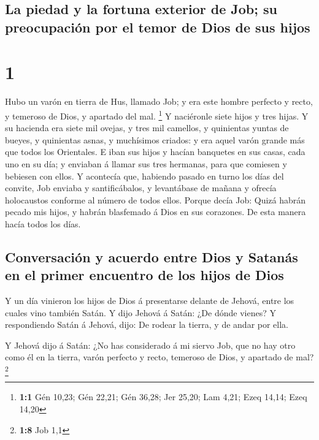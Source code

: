 \hypertarget{la-piedad-y-la-fortuna-exterior-de-job-su-preocupaciuxf3n-por-el-temor-de-dios-de-sus-hijos}{%
\subsection{La piedad y la fortuna exterior de Job; su preocupación por
el temor de Dios de sus
hijos}\label{la-piedad-y-la-fortuna-exterior-de-job-su-preocupaciuxf3n-por-el-temor-de-dios-de-sus-hijos}}

\hypertarget{section}{%
\section{1}\label{section}}

 Hubo un varón en tierra de Hus, llamado Job; y era este
hombre perfecto y recto, y temeroso de Dios, y apartado del mal.
\footnote{\textbf{1:1} Gén 10,23; Gén 22,21; Gén 36,28; Jer 25,20; Lam
  4,21; Ezeq 14,14; Ezeq 14,20}  Y naciéronle siete hijos
y tres hijas.  Y su hacienda era siete mil ovejas, y tres
mil camellos, y quinientas yuntas de bueyes, y quinientas asnas, y
muchísimos criados: y era aquel varón grande más que todos los
Orientales.  E iban sus hijos y hacían banquetes en sus
casas, cada uno en su día; y enviaban á llamar sus tres hermanas, para
que comiesen y bebiesen con ellos.  Y acontecía que,
habiendo pasado en turno los días del convite, Job enviaba y
santificábalos, y levantábase de mañana y ofrecía holocaustos conforme
al número de todos ellos. Porque decía Job: Quizá habrán pecado mis
hijos, y habrán blasfemado á Dios en sus corazones. De esta manera hacía
todos los días.

\hypertarget{conversaciuxf3n-y-acuerdo-entre-dios-y-satanuxe1s-en-el-primer-encuentro-de-los-hijos-de-dios}{%
\subsection{Conversación y acuerdo entre Dios y Satanás en el primer
encuentro de los hijos de
Dios}\label{conversaciuxf3n-y-acuerdo-entre-dios-y-satanuxe1s-en-el-primer-encuentro-de-los-hijos-de-dios}}

 Y un día vinieron los hijos de Dios á presentarse delante
de Jehová, entre los cuales vino también Satán.  Y dijo
Jehová á Satán: ¿De dónde vienes? Y respondiendo Satán á Jehová, dijo:
De rodear la tierra, y de andar por ella.

 Y Jehová dijo á Satán: ¿No has considerado á mi siervo
Job, que no hay otro como él en la tierra, varón perfecto y recto,
temeroso de Dios, y apartado de mal? \footnote{\textbf{1:8} Job 1,1}

